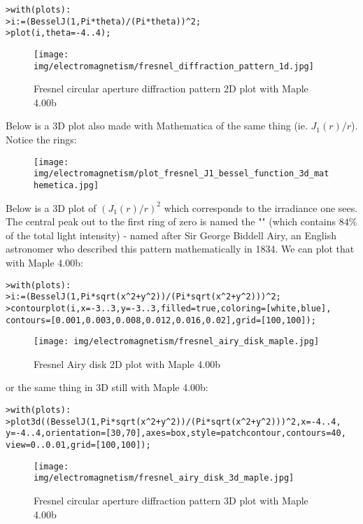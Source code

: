 	\texttt{>with(plots):}\\
	\texttt{>i:=(BesselJ(1,Pi*theta)/(Pi*theta))\string^2;}\\
	\texttt{>plot(i,theta=-4..4);}
	
	\begin{figure}[H]
		\centering
		\texttt{[image: img/electromagnetism/fresnel\_diffraction\_pattern\_1d.jpg]}
		\caption{Fresnel circular aperture diffraction pattern 2D plot with Maple 4.00b}
	\end{figure}
	
	Below is a 3D plot also made with Mathematica of the same thing (ie. $J_1(r)/r$). Notice the rings:
	\begin{figure}[H]
		\centering
		\texttt{[image: img/electromagnetism/plot\_fresnel\_J1\_bessel\_function\_3d\_mathemetica.jpg]}
	\end{figure}
	Below is a 3D plot of $(J_1(r)/r)^2$ which corresponds to the irradiance one sees. The central peak out to the first ring of zero is named the "" (which contains $84\%$ of the total light intensity) - named after Sir George Biddell Airy, an English astronomer who described this pattern mathematically in 1834. We can plot that with Maple 4.00b:
	
	\texttt{>with(plots):}\\
	\texttt{>i:=(BesselJ(1,Pi*sqrt(x\string^2+y\string^2))/(Pi*sqrt(x\string^2+y\string^2)))\string^2;}\\
	\texttt{>contourplot(i,x=-3..3,y=-3..3,filled=true,coloring=[white,blue],}	
	\texttt{contours=[0.001,0.003,0.008,0.012,0.016,0.02],grid=[100,100]);}
	
	\begin{figure}[H]
		\centering
		\texttt{[image: img/electromagnetism/fresnel\_airy\_disk\_maple.jpg]}
		\caption{Fresnel Airy disk 2D plot with Maple 4.00b}
	\end{figure}
	
	or the same thing in 3D still with Maple 4.00b:
	
	\texttt{>with(plots):}\\
	\texttt{>plot3d((BesselJ(1,Pi*sqrt(x\string^2+y\string^2))/(Pi*sqrt(x\string^2+y\string^2)))\string^2,x=-4..4,}\\
	\texttt{y=-4..4,orientation=[30,70],axes=box,style=patchcontour,contours=40,}
	\texttt{view=0..0.01,grid=[100,100]);}
	
	\begin{figure}[H]
		\centering
		\texttt{[image: img/electromagnetism/fresnel\_airy\_disk\_3d\_maple.jpg]}
		\caption{Fresnel circular aperture diffraction pattern 3D plot with Maple 4.00b}
	\end{figure}
	
